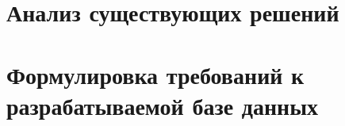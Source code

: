 %
%
%
%
%
%
%
%
%


\section{Анализ существующих решений}
\section{Формулировка требований к разрабатываемой базе данных}
